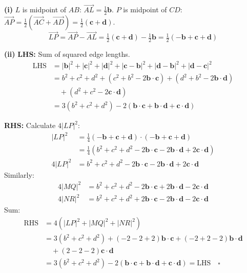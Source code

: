 \begin{solution}
\textbf{(i)} $L$ is midpoint of $AB$: $\vec{AL} = \tfrac{1}{2}\mathbf{b}$.
$P$ is midpoint of $CD$: $\vec{AP} = \tfrac{1}{2}(\vec{AC} + \vec{AD}) = \tfrac{1}{2}(\mathbf{c} + \mathbf{d})$.
$$\vec{LP} = \vec{AP} - \vec{AL} = \tfrac{1}{2}(\mathbf{c} + \mathbf{d}) - \tfrac{1}{2}\mathbf{b} = \tfrac{1}{2}(-\mathbf{b} + \mathbf{c} + \mathbf{d})$$

\textbf{(ii)} \textbf{LHS:} Sum of squared edge lengths.
\begin{align*}
\text{LHS} &= |\mathbf{b}|^2 + |\mathbf{c}|^2 + |\mathbf{d}|^2 + |\mathbf{c}-\mathbf{b}|^2 + |\mathbf{d}-\mathbf{b}|^2 + |\mathbf{d}-\mathbf{c}|^2\\
&= b^2 + c^2 + d^2 + (c^2 + b^2 - 2\mathbf{b} \cdot \mathbf{c}) + (d^2 + b^2 - 2\mathbf{b} \cdot \mathbf{d})\\
&\quad + (d^2 + c^2 - 2\mathbf{c} \cdot \mathbf{d})\\
&= 3(b^2 + c^2 + d^2) - 2(\mathbf{b} \cdot \mathbf{c} + \mathbf{b} \cdot \mathbf{d} + \mathbf{c} \cdot \mathbf{d})
\end{align*}

\textbf{RHS:} Calculate $4|LP|^2$:
\begin{align*}
|LP|^2 &= \tfrac{1}{4}(-\mathbf{b} + \mathbf{c} + \mathbf{d}) \cdot (-\mathbf{b} + \mathbf{c} + \mathbf{d})\\
&= \tfrac{1}{4}(b^2 + c^2 + d^2 - 2\mathbf{b} \cdot \mathbf{c} - 2\mathbf{b} \cdot \mathbf{d} + 2\mathbf{c} \cdot \mathbf{d})\\
4|LP|^2 &= b^2 + c^2 + d^2 - 2\mathbf{b} \cdot \mathbf{c} - 2\mathbf{b} \cdot \mathbf{d} + 2\mathbf{c} \cdot \mathbf{d}
\end{align*}
\vspace{-2mm}
Similarly:
\vspace{-2mm}
\begin{align*}
4|MQ|^2 &= b^2 + c^2 + d^2 - 2\mathbf{b} \cdot \mathbf{c} + 2\mathbf{b} \cdot \mathbf{d} - 2\mathbf{c} \cdot \mathbf{d}\\
4|NR|^2 &= b^2 + c^2 + d^2 + 2\mathbf{b} \cdot \mathbf{c} - 2\mathbf{b} \cdot \mathbf{d} - 2\mathbf{c} \cdot \mathbf{d}
\end{align*}
\vspace{-2mm}
Sum:
\vspace{-2mm}
\begin{align*}
\text{RHS} &= 4(|LP|^2 + |MQ|^2 + |NR|^2)\\
&= 3(b^2 + c^2 + d^2) + (-2-2+2)\mathbf{b} \cdot \mathbf{c} + (-2+2-2)\mathbf{b} \cdot \mathbf{d}\\
&\quad + (2-2-2)\mathbf{c} \cdot \mathbf{d}\\
&= 3(b^2 + c^2 + d^2) - 2(\mathbf{b} \cdot \mathbf{c} + \mathbf{b} \cdot \mathbf{d} + \mathbf{c} \cdot \mathbf{d}) = \text{LHS} \quad \square
\end{align*}
\end{solution}

